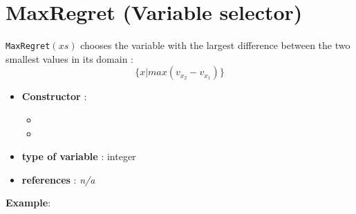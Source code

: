 \section{MaxRegret (Variable selector)}\label{maxregret:maxregretvarselector}\hypertarget{maxregret:maxregretvarselector}{}
\begin{notedef}
  \texttt{MaxRegret}$(xs)$ chooses the variable with the largest difference between the two smallest values in its domain :
$$\{x | max(v_{x_{2}} - v_{x_{1}})\}$$
\end{notedef}

\begin{itemize}
	\item \textbf{Constructor} : 
	\begin{itemize}
	\item {}
	\item {}
	\end{itemize}	
	\item \textbf{type of variable} : integer
	\item \textbf{references} : \emph{n/a}
\end{itemize}

\textbf{Example}:
%

